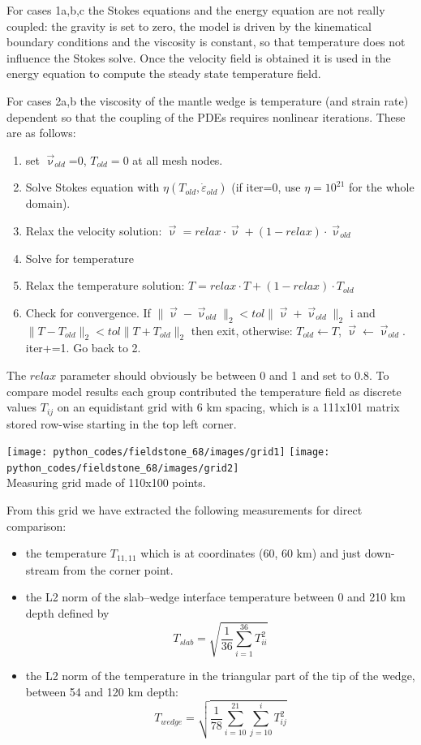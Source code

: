 For cases 1a,b,c the Stokes equations and the energy equation are not really coupled: 
the gravity is set to zero, the model is driven by the kinematical boundary conditions 
and the viscosity is constant, so that temperature does not 
influence the Stokes solve. Once the velocity field is obtained it is used 
in the energy equation to compute the steady state temperature field. 

For cases 2a,b the viscosity of the mantle 
wedge is temperature (and strain rate) dependent so that the coupling of the PDEs 
requires nonlinear iterations. These are as follows:
\begin{enumerate}
\item set $\vec{\upnu}_{old}$=0, $T_{old}=0$ at all mesh nodes.
\item Solve Stokes equation with $\eta(T_{old},\dot{\varepsilon}_{old})$ (if iter=0, use $\eta=10^{21}$ for the whole domain).
\item Relax the velocity solution: $\vec\upnu = relax \cdot \vec{\upnu} + (1-relax)\cdot \vec{\upnu}_{old}$
\item Solve for temperature 
\item Relax the temperature solution: $T=relax \cdot T + (1-relax) \cdot T_{old}$
\item Check for convergence. If $\|\vec\upnu-\vec\upnu_{old}\|_2 < tol \| \vec\upnu + \vec\upnu_{old}  \|_2$ i
and $\|T-T_{old}\|_2 < tol \| T + T_{old}  \|_2$ then exit, 
otherwise: $T_{old} \leftarrow T$, $ \vec\upnu \leftarrow \vec\upnu_{old} $. iter+=1. Go back to 2. 
\end{enumerate}

The $relax$ parameter should obviously be between 0 and 1 and set to 0.8. 
To compare model results each
group contributed the temperature field as discrete values $T_{ij}$ on
an equidistant grid with 6 km spacing, which is a 111x101 matrix
stored row-wise starting in the top left corner. 

\begin{center}
\texttt{[image: python\_codes/fieldstone\_68/images/grid1]}
\texttt{[image: python\_codes/fieldstone\_68/images/grid2]}\\
{\captionfont Measuring grid made of 110x100 points.}
\end{center}

From this grid we have extracted the following measurements for direct comparison:
\begin{itemize}
\item the temperature $T_{11,11}$ which is at coordinates (60, 60 km) and
just down-stream from the corner point.
\item the L2 norm of the slab–wedge interface temperature between
0 and 210 km depth defined by
\[
T_{slab} = \sqrt{\frac{1}{36} \sum_{i=1}^{36} T_{ii}^2  }
\]
\item 
the L2 norm of the temperature in the triangular part of the
tip of the wedge, between 54 and 120 km depth:
\[
T_{wedge} = \sqrt{ \frac{1}{78} \sum_{i=10}^{21} \sum_{j=10}^i T_{ij}^2   }
\]
\end{itemize}

